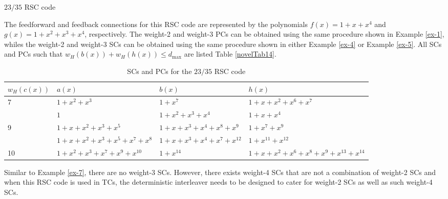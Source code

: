 \begin{example}{$23/35$ RSC code}

The feedforward and feedback connections for this RSC code are represented by the polynomials  $f(x)=1+x+x^4$ and  $g(x)=1+x^2+x^3+x^4$, respectively. The weight-2 and weight-3 PCs can be obtained using the same procedure shown in Example \ref{ex-1}, whiles the weight-2 and weight-3 SCs can be obtained using the same procedure shown in either Example \ref{ex-4} or Example \ref{ex-5}. All SCs and PCs such that $w_H(b(x))+w_H(h(x)) \leq d_{\text{max}}$ are listed Table \ref{novelTab14}.
\begin{table}[htbp]
	\caption{SCs and PCs for the $23/35$ RSC code}
	\centering
	\begin{tabularx}{0.75\textwidth}{lXlX} 
		\hline
		$w_H(c(x))$ & $a(x)$ & $b(x)$ & $h(x)$ \\ [0.5ex] 
		\hline\hline
		7&$1+x^2+x^3$ & $1+x^7$ & $1+x+x^2+x^6+x^7$\\
		\hline
		&$1$ & $1+x^2+x^3+x^4$ & $1+x+x^{4}$\\
		\hline \hline
		9&$1+x+x^2+x^3+x^5$ & $1+x+x^3+x^4+x^8+x^9$ & $1+x^7+x^9$\\
		\hline
		&$1+x+x^2+x^3+x^5+x^7+x^8$ & $1+x+x^3+x^4+x^7+x^{12}$ & $1+x^{11}+x^{12}$\\
		\hline\hline
		10&$1+x^2+x^3+x^7+x^9+x^{10}$ & $1+x^{14}$ & $1+x+x^2+x^6+x^8+x^9+x^{13}+x^{14}$\\
		\hline
	\end{tabularx}
	
	\label{novelTab15}
\end{table}

Similar to Example \ref{ex-7}, there are no weight-3 SCs. However, there exists weight-4 SCs that are not a combination of weight-2 SCs and when this RSC code is used in TCs, the deterministic interleaver needs to be designed to cater for weight-2 SCs as well as such weight-4 SCs. 
 

\end{example}
